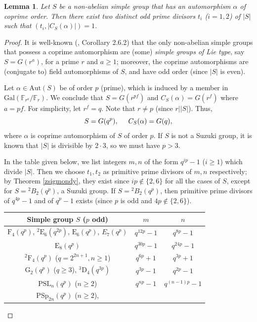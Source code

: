 \documentclass[11pt, a4paper]{article}
\numberwithin{equation}{section}
\theoremstyle{plain} %
\newtheorem{lemma}[theorem]{Lemma}
\begin{document}
\begin{lemma}\label{lem2.9}
Let $S$ be a non-abelian simple group that has an automorphism $\alpha$ of coprime order. Then there exist two distinct odd prime divisors $t_i$ ($i=1,2$) of $|S|$ such that $(t_i,|C_S(\alpha)|)=1$.
\end{lemma}
\begin{proof}
It is well-known (\cite{MR3753581}, Corollary 2.6.2) that the only non-abelian simple groups that possess a coprime automorphism are (some) \textit{simple groups of Lie type}, say $S=G(r^a)$, for a prime $r$ and $a\geq 1$; moreover, the coprime automorphisms are (conjugate to) field automorphisms of $S$, and have odd order (since $|S|$ is even). 

Let $\alpha\in\mathrm{Aut}(S)$ be of order $p$ (prime), which is induced by a member in $\mathrm{Gal}(\mathbb{F}_{r^a}/\mathbb{F}_r)$. We conclude that $S=G(r^{pf})$ and $C_S(\alpha)=G(r^f)$ where $a=pf$. For simplicity, let $r^f=q$. Note that $r\neq p$ (since $r||S|$). Thus, 
$$
S=G(q^p), \hskip5mm C_S(\alpha)=G(q),
$$
where $\alpha$ is coprime automorphism of $S$ of order $p$. If $S$ is not a Suzuki group, it is known that $|S|$ is divisible by $2\cdot 3$, so we must have $p>3$.

In the table given below, we list integers $m,n$ of the form $q^{ip}-1$ ($i\ge 1$) which divide $|S|$. Then we choose $t_1,t_2$ as primitive prime divisors of $m,n$ respectively; by Theorem \ref{zsigmondy}, they exist since $ip\notin \{2,6\}$ for all the cases of $S$, except for $S={}^2B_2(q^p)$, a Suzuki group. If $S={}^2B_2(q^p)$, then primitive prime divisors of $q^{4p}-1$ and of $q^p-1$ exists (since $p$ is odd and $4p\notin \{2,6\}$). 
 

\vskip2mm
\begin{center}
\begin{tabular}{|c|c|c|}
\hline
\textbf{Simple group $S$} ($p$ odd) & $m$ & $n$ \\
\hline
$\mathrm{F}_4(q^p)$, ${}^2\mathrm{E}_6(q^{2p})$, $\mathrm{E}_6(q^p)$, $E_7(q^p)$ & $q^{12p}-1$ & $q^{8p}-1$ \\\hline

$\mathrm{E}_8(q^p)$ & $q^{30p}-1$ & $q^{24p}-1$ \\
\hline
${}^2\mathrm{F}_4(q^p)$ ($q=2^{2n+1},n\geq 1$) & $q^{6p}+1$ & $q^{3p}+1$ \\
\hline

$\mathrm{G}_2(q^p)$ ($q\geq 3$), $^3\mathrm{D}_4(q^{3p})$ & $q^{3p}-1$ & $q^{2p}-1$ \\
\hline
$\mathrm{PSL}_n(q^p)$ ($n\geq 2$) & $q^{np}-1$ & $q^{(n-1)p}-1$ \\
\hline
$\mathrm{PSp}_{2n}(q^p)$ ($n\geq2$), &  &  \\


\end{tabular}
\end{center}
\end{proof}
\end{document}
